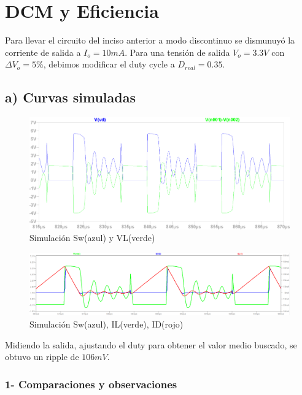 \documentclass[e4_tp1_main.tex]{subfiles}
\begin{document}
\section{DCM y Eficiencia}


Para llevar el circuito del inciso anterior a modo discontinuo se dismunuy\'o la corriente de salida a $I_o=10mA$.  Para una tensi\'on de salida $V_o=3.3V$ con $\Delta V_o =5\%$, debimos modificar el duty cycle a $D_{real}=0.35$.


\subsection*{a) Curvas simuladas}

\begin{figure}[H]
\centering
\includegraphics[width=0.9\linewidth]{Imagenes/Punto4/SW&VL}
\caption{Simulación Sw(azul) y VL(verde)}
\end{figure}

\begin{figure}[H]
\centering
\includegraphics[width=0.9\linewidth]{Imagenes/Punto4/SW&IL&ID}
\caption{Simulación Sw(azul), IL(verde), ID(rojo)}
\end{figure}

Midiendo la salida, ajustando el duty para obtener el valor medio buscado, se obtuvo un ripple de $106mV$.

\subsubsection*{1- Comparaciones y observaciones}
\end{document}
